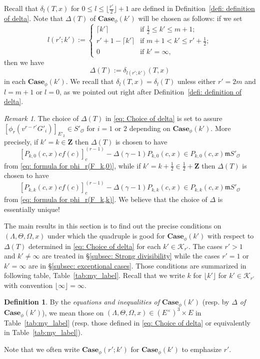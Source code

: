 \documentclass[11pt]{amsart}
\theoremstyle{definition}
\numberwithin{equation}{subsection}
\theoremstyle{plain}
\theoremstyle{plain}
\theoremstyle{plain}
\theoremstyle{plain}
\theoremstyle{plain}
\theoremstyle{plain}
\theoremstyle{plain}
\theoremstyle{plain}
\theoremstyle{plain}
\theoremstyle{plain}
\theoremstyle{plain}
\theoremstyle{plain}
\theoremstyle{definition}
\newtheorem{defi}[equation]{Definition}
\theoremstyle{definition}
\theoremstyle{definition}
\theoremstyle{remark}
\newtheorem{rema}[equation]{Remark}
\renewcommand{\(}{\textup{(}}
\renewcommand{\)}{\textup{)}}
\newcommand{\Z}{\mathbf{Z}}
\newcommand{\fm}{\mathfrak{m}}
\newcommand{\cO}{\mathcal{O}}
\newcommand{\cK}{\mathcal{K}}
\begin{document}
Recall that $\delta_{l}(T,x)$ for $0\leq l\leq \lfloor\tfrac{r'}{2}\rfloor+1$ are defined in Definition~\ref{defi: definition of delta}. Note that $\Delta(T)$ of $\mathbf{Case}_\phi(k')$ will be chosen as follows: if we set
\begin{equation}\label{eq: definition of l(r;k')}
l(r';k'):=
\begin{cases}
\lceil k'\rceil & \mbox{if }\frac{1}{2}\leq k'\leq m+1;\\
r'+1-\lceil k'\rceil & \mbox{if }m+1< k'\leq r'+\frac{1}{2};\\
0 & \mbox{if }k'=\infty,
\end{cases}
\end{equation}
then we have 
\begin{equation}\label{eq: Choice of delta}
\Delta(T):=\delta_{l(r';k')}(T,x)
\end{equation} 
in each $\mathbf{Case}_\phi(k')$. We recall that $\delta_{l}(T,x)=\delta_l(T)$ unless either $r'=2m$ and $l=m+1$ or $l=0$, as we pointed out right after Definition~\ref{defi: definition of delta}.

\begin{rema}
The choice of $\Delta(T)$ in \eqref{eq: Choice of delta} is set to assure $[\phi_r(v^{r-r'}G'_i)]_{E'_2}\in S'_{\cO}$ for $i=1$ or $2$ depending on $\mathbf{Case}_\phi(k')$. More precisely, if $k'=k\in\Z$ then $\Delta(T)$ is chosen to have $$[P_{k,0}(c,x)cf(c)]_c^{(r-1)}-\Delta(\gamma-1)P_{k,0}(c,x)\in P_{k,0}(c,x)\fm S'_{\cO}$$ from \eqref{eq: formula for phi_r(F_k,0)}, while if $k'=k+\frac{1}{2}\in \frac{1}{2}+\Z$ then $\Delta(T)$ is chosen to have $$[P_{k,k}(c,x)cf(c)]_c^{(r-1)}-\Delta(\gamma-1)P_{k,k}(c,x)\in P_{k,k}(c,x)\fm S'_{\cO}$$ from \eqref{eq: formula for phi_r(F_k,k)}. We believe that the choice of $\Delta$ is essentially unique!
\end{rema}


The main results in this section is to find out the precise conditions on $(\Lambda,\Theta,\Omega,x)$ under which the quadruple is good for $\mathbf{Case}_\phi(k')$ with respect to $\Delta(T)$ determined in \eqref{eq: Choice of delta} for each $k'\in\cK_{r'}$. The cases $r'>1$ and $k'\neq\infty$ are treated in \S\ref{subsec: Strong divisibility} while the cases $r'=1$ or $k'=\infty$ are in \S\ref{subsec: exceptional cases}. Those conditions are summarized in following table, Table~\ref{tab:my_label}. Recall that we write $k$ for $\lfloor k'\rfloor$ for $k'\in\cK_{r'}$ with convention $\lfloor\infty\rfloor=\infty$.

\begin{defi}\label{defi: equation and inequalities, local}
By the \emph{equations and inequalities of $\mathbf{Case}_\phi(k')$} (resp. by \emph{$\Delta$ of $\mathbf{Case}_\phi(k')$}), we mean those on $(\Lambda,\Theta,\Omega,x)\in (E^\times)^3\times E$ in Table~\ref{tab:my_label} (resp. those defined in \eqref{eq: Choice of delta} or equivalently in Table~\ref{tab:my_label}).
\end{defi}
Note that we often write $\mathbf{Case}_\phi(r';k')$ for $\mathbf{Case}_\phi(k')$ to emphasize $r'$.
\end{document}
